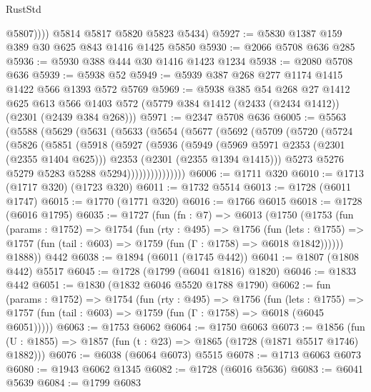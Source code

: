 \begin{lexlean}{RustStd}
\begin{coremodule}
{\begin{coremodule}
{{{{{{{{{{{{{              @5807))))
      @5814
      @5817
      @5820
      @5823
      @5434)
@5927 := @5830 @1387 @159 @389 @30 @625 @843 @1416 @1425 @5850
@5930 := @2066 @5708 @636 @285
@5936 := @5930 @388 @444 @30 @1416 @1423 @1234
@5938 := @2080 @5708 @636
@5939 := @5938 @52
@5949 := @5939 @387 @268 @277 @1174 @1415 @1422 @566 @1393 @572 @5769
@5969 := @5938
    @385
    @54
    @268
    @27
    @1412
    @625
    @613
    @566
    @1403
    @572
    (@5779 @384 @1412 (@2433 (@2434 @1412)) (@2301 (@2439 @384 @268)))
@5971 := @2347 @5708 @636
@6005 := @5563
    (@5588
      (@5629
        (@5631
          (@5633
            (@5654
              (@5677
                (@5692
                  (@5709
                    (@5720
                      (@5724
                        (@5826
                          (@5851
                            (@5918
                              (@5927
                                (@5936
                                  (@5949
                                    (@5969 @5971 @2353 (@2301 (@2355 @1404 @625)))
                                    @2353
                                    (@2301 (@2355 @1394 @1415)))
                                  @5273
                                  @5276
                                  @5279
                                  @5283
                                  @5288
                                  @5294)))))))))))))))
@6006 := @1711 @320
@6010 := @1713 (@1717 @320) (@1723 @320)
@6011 := @1732 @5514
@6013 := @1728 (@6011 @1747)
@6015 := @1770 (@1771 @320)
@6016 := @1766 @6015
@6018 := @1728 (@6016 @1795)
@6035 := @1727
    (fun (fn : @7) =>
    @6013
      (@1750
        (@1753
          (fun (params : @1752) =>
          @1754
            (fun (rty : @495) =>
            @1756
              (fun (lets : @1755) =>
              @1757 (fun (tail : @603) => @1759 (fun (Γ : @1758) => @6018 @1842))))))
        @1888))
    @442
@6038 := @1894 (@6011 (@1745 @442))
@6041 := @1807 (@1808 @442) @5517
@6045 := @1728 (@1799 (@6041 @1816) @1820)
@6046 := @1833 @442
@6051 := @1830 (@1832 @6046 @5520 @1788 @1790)
@6062 := fun (params : @1752) =>
  @1754
    (fun (rty : @495) =>
    @1756
      (fun (lets : @1755) =>
      @1757 (fun (tail : @603) => @1759 (fun (Γ : @1758) => @6018 (@6045 @6051)))))
@6063 := @1753 @6062
@6064 := @1750 @6063
@6073 := @1856 (fun (U : @1855) => @1857 (fun (t : @23) => @1865 (@1728 (@1871 @5517 @1746) @1882)))
@6076 := @6038 (@6064 @6073) @5515
@6078 := @1713 @6063 @6073
@6080 := @1943 @6062 @1345
@6082 := @1728 (@6016 @5636)
@6083 := @6041 @5639
@6084 := @1799 @6083
}}}}}}}}}}}}}
\end{coremodule}}
\end{coremodule}
\end{lexlean}

